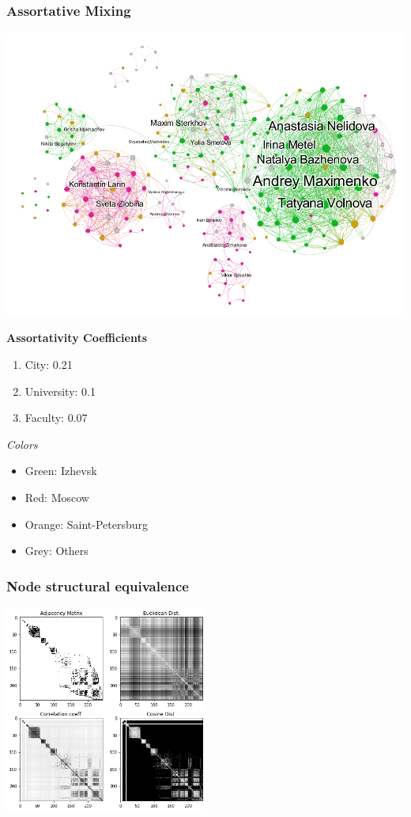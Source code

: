 \documentclass{beamer}
\begin{document}
\begin{frame}
\frametitle{Assortative Mixing}
\begin{multicols}{2}
	\includegraphics[width=\columnwidth]{nodes_by_city.png}
	\columnbreak
	
	\textbf{Assortativity Coefficients}
	\begin{enumerate}
	\item City: 0.21
	\item University: 0.1
	\item Faculty: 0.07
	\end{enumerate}
	\medskip	
	\textit{Colors}
	\begin{itemize}
	\item Green: Izhevsk
	\item Red: Moscow
	\item Orange: Saint-Petersburg
	\item Grey: Others
	\end{itemize}
	
\end{multicols}

\end{frame}


\begin{frame}
\frametitle{Node structural equivalence}
\includegraphics[width=0.5\textwidth]{node_structural_equivalence.png}
\end{frame}
\end{document}
